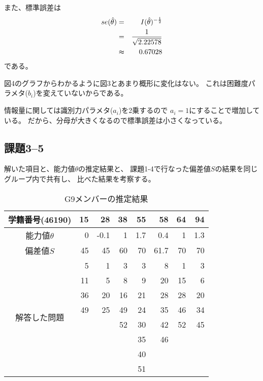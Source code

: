 \documentclass[12pt]{jarticle}
\begin{document}
また、標準誤差は
\begin{eqnarray*}
    se(\hat{\theta})&=&I(\hat{\theta})^{-\frac{1}{2}}\\
    &= &\frac{1}{\sqrt{2.22578}}\\
    &\thickapprox& 0.67028
\end{eqnarray*}
である。

図4のグラフからわかるように図3とあまり概形に変化はない。
これは困難度パラメタ($b_i$)を変えていないからである。

情報量に関しては識別力パラメタ($a_i$)を2乗するので
$a_i=1$にすることで増加している。
だから、分母が大きくなるので標準誤差は小さくなっている。

\clearpage

\subsection{課題3–5}
\begin{shadebox}
    解いた項目と、能力値$\theta$の推定結果と、
    課題1-4で行なった偏差値$S$の結果を同じグループ内で共有し、
    比べた結果を考察する。
\end{shadebox}

\begin{table}[htb]
    \begin{center}
        \caption{G9メンバーの推定結果}
        \begin{tabular}{|c|r|r|r|r|r|r|r|}
            \hline
            学籍番号(46190)               & 15 & 28   & 38 & 55  & 58   & 64 & 94  \\
            \hline
            能力値$\theta$                & 0  & -0.1 & 1  & 1.7 & 0.4  & 1  & 1.3 \\
            \hline
            偏差値$S$                     & 45 & 45   & 60 & 70  & 61.7 & 70 & 70  \\
            \hline
            \multirow{8}{*}{解答した問題} & 5  & 1    & 3  & 3   & 8    & 1  & 3   \\
                                          & 11 & 5    & 8  & 9   & 20   & 15 & 6   \\
                                          & 36 & 20   & 16 & 21  & 28   & 28 & 20  \\
                                          & 49 & 25   & 49 & 24  & 35   & 46 & 34  \\
                                          &    &      & 52 & 30  & 42   & 52 & 45  \\
                                          &    &      &    & 35  & 46   &    &     \\
                                          &    &      &    & 40  &      &    &     \\
                                          &    &      &    & 51  &      &    &     \\
            \hline
        \end{tabular}
    \end{center}
\end{table}
\end{document}
